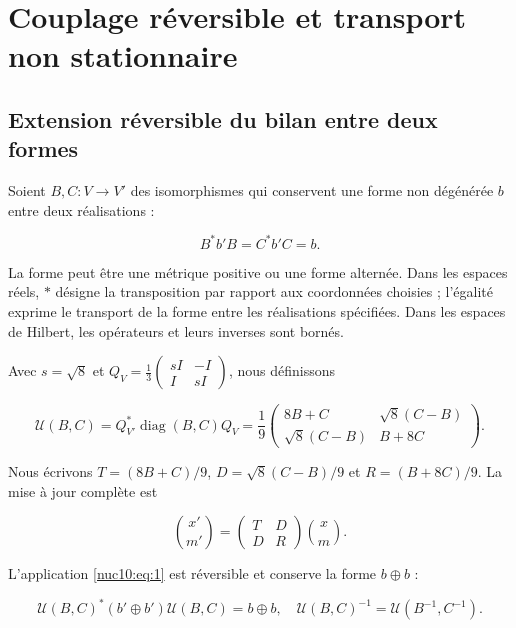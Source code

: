 \section{Couplage réversible et transport non stationnaire}
\label{nuclear:10}
\subsection{Extension réversible du bilan entre deux formes}

Soient \(B,C:V\to V'\) des isomorphismes qui conservent une forme non dégénérée \(b\) entre deux réalisations :



\[
B^*b'B=C^*b'C=b.
\]



La forme peut être une métrique positive ou une forme alternée. Dans les espaces réels, \(*\) désigne la transposition par rapport aux coordonnées choisies ; l’égalité exprime le transport de la forme entre les réalisations spécifiées. Dans les espaces de Hilbert, les opérateurs et leurs inverses sont bornés.


Avec \(s=\sqrt8\) et \(Q_V=\frac13\left(\begin{smallmatrix}sI&-I\\I&sI\end{smallmatrix}\right)\), nous définissons



\begin{equation}
\boxed{
\mathcal U(B,C)=Q_{V'}^*\operatorname{diag}(B,C)Q_V
=\frac19\begin{pmatrix}8B+C&\sqrt8(C-B)\\\sqrt8(C-B)&B+8C\end{pmatrix}.}
\label{nuc10:eq:1}
\end{equation}



Nous écrivons \(T=(8B+C)/9\), \(D=\sqrt8(C-B)/9\) et \(R=(B+8C)/9\). La mise à jour complète est



\begin{equation}
\binom{x'}{m'}=\begin{pmatrix}T&D\\D&R\end{pmatrix}\binom{x}{m}.
\label{nuc10:eq:2}
\end{equation}



\begin{theorem}
L’application \eqref{nuc10:eq:1} est réversible et conserve la forme \(b\oplus b\) :



\begin{equation}
\mathcal U(B,C)^*(b'\oplus b')\mathcal U(B,C)=b\oplus b,
\quad\mathcal U(B,C)^{-1}=\mathcal U(B^{-1},C^{-1}).
\label{nuc10:eq:3}
\end{equation}
\end{theorem}



